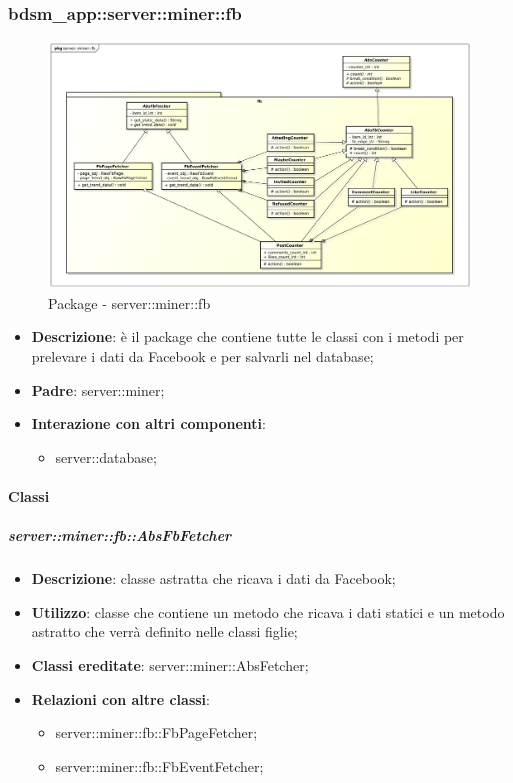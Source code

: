\subsubsection{bdsm\_app::server::miner::fb} %
\label{ssub:bdsm_app_server_miner_fb}
\begin{figure}[htbp]
	\centering
	\centerline{\includegraphics[scale=0.3]{./images/server/miner_fb.pdf}}
	\caption{Package - server::miner::fb}
\end{figure}

\begin{itemize}
  \item \textbf{Descrizione}: è il package che contiene tutte le classi con i metodi per prelevare i dati da Facebook e per salvarli nel database;
  \item \textbf{Padre}: server::miner;
  \item \textbf{Interazione con altri componenti}:
  	\begin{itemize}
  		\item server::database;
  	\end{itemize}
\end{itemize}

	\paragraph{Classi} %
		\subparagraph{server::miner::fb::AbsFbFetcher} %
		\label{subp:server_miner_fb_AbsFbFetcher}
			\begin{itemize}
				\item \textbf{Descrizione}: classe astratta che ricava i dati da Facebook;
				\item \textbf{Utilizzo}: classe che contiene un metodo che ricava i dati statici e un metodo astratto che verrà definito nelle classi figlie;
				\item \textbf{Classi ereditate}: server::miner::AbsFetcher;
				\item \textbf{Relazioni con altre classi}:
					\begin{itemize}
						\item server::miner::fb::FbPageFetcher;
						\item server::miner::fb::FbEventFetcher;
					\end{itemize}
			\end{itemize}

